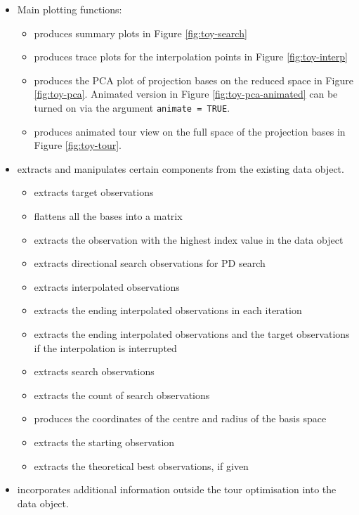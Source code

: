 \begin{itemize}
\item
  Main plotting functions:

  \begin{itemize}
  \tightlist
  \item
     produces summary plots in Figure
    \ref{fig:toy-search}
  \item
    produces trace plots for the
    interpolation points in Figure \ref{fig:toy-interp}
  \item
     produces the PCA plot of projection
    bases on the reduced space in Figure \ref{fig:toy-pca}. Animated
    version in Figure \ref{fig:toy-pca-animated} can be turned on via
    the argument \texttt{animate\ =\ TRUE}.
  \item
     produces animated tour view on the
    full space of the projection bases in Figure \ref{fig:toy-tour}.
  \end{itemize}
\item
   extracts and manipulates certain components from the
  existing data object.

  \begin{itemize}
  \tightlist
  \item
     extracts target observations
  \item
     flattens all the bases into a matrix
  \item
     extracts the observation with the highest index
    value in the data object
  \item
     extracts directional search observations
    for PD search
  \item
     extracts interpolated observations
  \item
     extracts the ending interpolated
    observations in each iteration
  \item
     extracts the ending interpolated
    observations and the target observations if the interpolation is
    interrupted
  \item
     extracts search observations
  \item
     extracts the count of search
    observations
  \item
     produces the coordinates of the centre
    and radius of the basis space
  \item
     extracts the starting observation
  \item
     extracts the theoretical best observations, if
    given
  \end{itemize}
\item
   incorporates additional information outside the tour
  optimisation into the data object.


\end{itemize}
